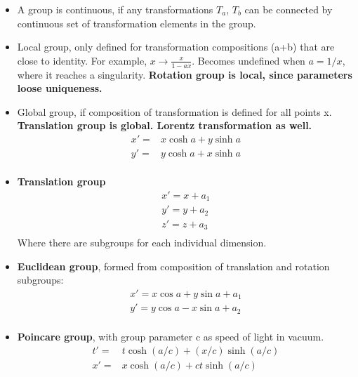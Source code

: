 \begin{itemize}
    \item A group is continuous, if any transformations $T_a$, $T_b$ can be connected by continuous set of transformation elements in the group. \cite{ibragimov}
    \item Local group, only defined for transformation compositions (a+b) that are close to identity. For example, $x\to\frac{x}{1-ax}$. Becomes undefined when $a=1/x$, where it reaches a singularity. \textbf{Rotation group is local, since parameters loose uniqueness.} \cite{ibragimov}
    \item Global group, if composition of transformation is defined for all points x. \textbf{Translation group is global. Lorentz transformation as well.} \cite{ibragimov}
    \begin{equation}\begin{split}
    x'=&x\cosh{a}+y\sinh{a} \\
    y'=&y\cosh{a}+x\sinh{a} \\
    \end{split}\end{equation}
    \item \textbf{Translation group} \cite{ibragimov}
    \begin{equation}\begin{split}
    x'=x+a_1 \\
    y'=y+a_2 \\
    z'=z+a_3 \\
    \end{split}\end{equation}
    Where there are subgroups for each individual dimension.
    \item \textbf{Euclidean group}, formed from composition of translation and rotation subgroups: \cite{ibragimov}
    \begin{equation}\begin{split}
    x'=x\cos{a}+y\sin{a}+a_1 \\
    y'=y\cos{a}-x\sin{a}+a_2 \\
    \end{split}\end{equation}
    \item \textbf{Poincare group}, with group parameter c as speed of light in vacuum. \cite{ibragimov}
    \begin{equation}\begin{split}
        t'=&t\cosh(a/c)+(x/c)\sinh(a/c) \\
        x'=&x\cosh(a/c)+ct\sinh(a/c) \\
    \end{split}\end{equation}
\end{itemize}

